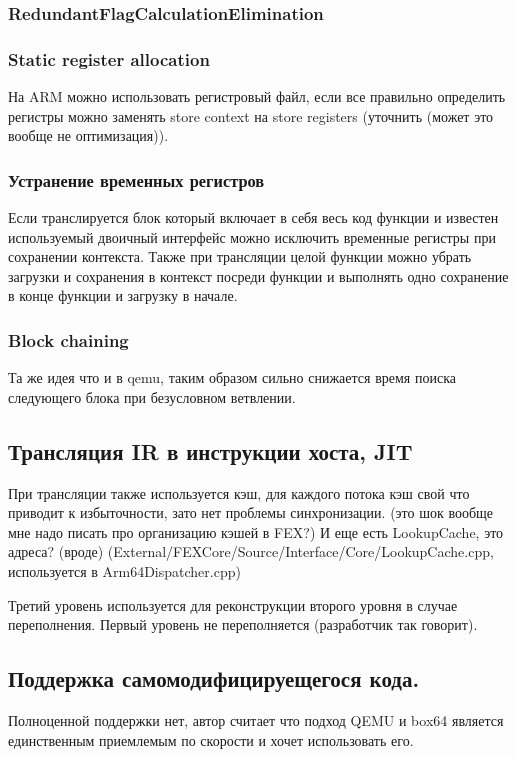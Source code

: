 \subsubsection{RedundantFlagCalculationElimination}

\subsubsection{Static register allocation}
На ARM можно использовать регистровый файл, если все правильно определить регистры можно заменять store context на store registers (уточнить (может это вообще не оптимизация)).

\subsubsection{Устранение временных регистров}
Если транслируется блок который включает в себя весь код функции и известен используемый двоичный интерфейс можно исключить временные регистры при сохранении контекста. Также при трансляции целой функции можно убрать загрузки и сохранения в контекст посреди функции и выполнять одно сохранение в конце функции и загрузку в начале.

\subsubsection{Block chaining}
Та же идея что и в qemu, таким образом сильно снижается время поиска следующего блока при безусловном ветвлении.

\subsection{Трансляция IR в инструкции хоста, JIT}

При трансляции также используется кэш, для каждого потока кэш свой что приводит к избыточности, зато нет проблемы синхронизации. (это шок вообще мне надо писать про организацию кэшей в FEX?)
И еще есть LookupCache, это адреса? (вроде)
(External/FEXCore/Source/Interface/Core/LookupCache.cpp, используется в Arm64Dispatcher.cpp)

Третий уровень используется для реконструкции второго уровня в случае переполнения. Первый уровень не переполняется (разработчик так говорит).

\subsection{Поддержка самомодифицируещегося кода.}
Полноценной поддержки нет, автор считает что подход QEMU и box64 является единственным приемлемым по скорости и хочет использовать его.

